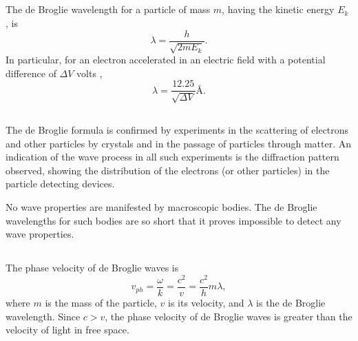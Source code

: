 \subsection{}\label{38.1.5} The de Broglie wavelength for a particle of mass $m$, having the kinetic energy $E_{k}$ , is
\begin{equation*}%
\lambda = \frac{h}{\sqrt{2m E_{k}}}.
\end{equation*}
In particular, for an electron accelerated in an electric field
with a potential difference of $\Delta V$ volts ,
\begin{equation*}%
\lambda = \frac{12.25}{\sqrt{\Delta V}} \si{\angstrom}.
\end{equation*}

\subsection{}\label{38.1.6} The de Broglie formula is confirmed by experiments in the scattering of electrons and other particles by crystals and in the passage of particles through matter. An indication of the wave process in all such experiments is the diffraction pattern observed, showing the distribution of the electrons (or other particles) in the particle detecting devices.

No wave properties are manifested by macroscopic bodies. The
de Broglie wavelengths for such bodies are so short that it
proves impossible to detect any wave properties.

\subsection{}\label{38.1.7} The phase velocity  of de Broglie waves is
\begin{equation*}%
v_{ph} = \frac{\omega}{k} = \frac{c^{2}}{v} = \frac{c^{2}}{h} m \lambda,
\end{equation*}
where $m$ is the mass of the particle, $v$ is its velocity, and $\lambda$ is the de Broglie wavelength. Since $c > v$, the phase velocity of de Broglie waves is greater than the velocity of light in free space. 

